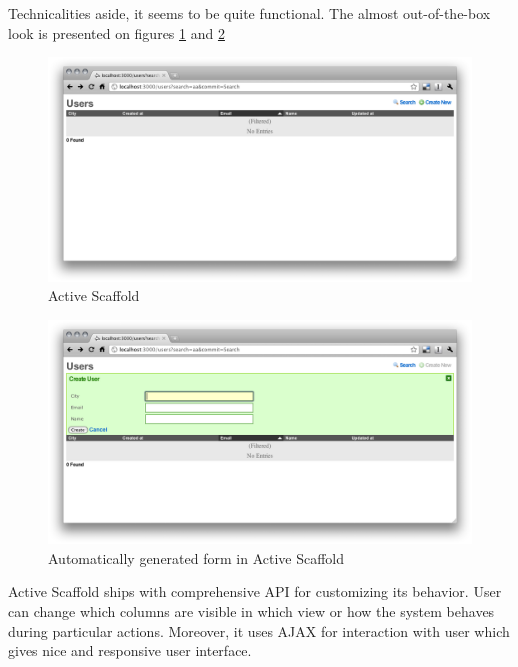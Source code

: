       Technicalities aside, it seems to be quite functional. The almost out-of-the-box look is presented on figures \ref{activescaffold1} and \ref{activescaffold2}
      \begin{figure}[hbt!]
    		\begin{center}
    			\includegraphics[width=\linewidth]{images/chapter01/activescaffold1.png}
    			\caption{Active Scaffold}
    			\label{activescaffold1}
    		\end{center}
    	\end{figure}
    	
    	\begin{figure}[hbt!]
    		\begin{center}
    			\includegraphics[width=\linewidth]{images/chapter01/activescaffold2.png}
    			\caption{Automatically generated form in Active Scaffold}
    			\label{activescaffold2}
    		\end{center}
    	\end{figure}
      
    Active Scaffold ships with comprehensive API for customizing its behavior. User can change which columns are visible in which view or how the system behaves during particular actions. Moreover, it uses  \ac{AJAX} for interaction with user which gives nice and responsive user interface.
    
